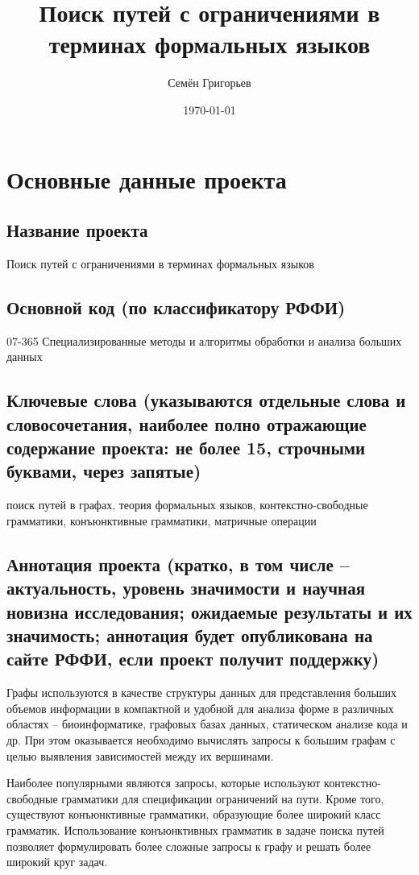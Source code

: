 \documentclass[12pt]{article}  %
\title{Поиск путей с ограничениями в терминах формальных языков}
\author{Семён Григорьев}
\date{\today}
\theoremstyle{remark}
\begin{document}

\maketitle

\section{Основные данные проекта}

\subsection{Название проекта}
Поиск путей с ограничениями в терминах формальных языков

\subsection{Основной код (по классификатору РФФИ)}
07-365 Специализированные методы и алгоритмы обработки и анализа больших данных

\subsection{Ключевые слова (указываются отдельные слова и словосочетания, наиболее полно отражающие содержание проекта: не более 15, строчными буквами, через запятые)}
поиск путей в графах, теория формальных языков, контекстно-свободные грамматики, конъюнктивные грамматики, матричные операции

\subsection{Аннотация проекта (кратко, в том числе – актуальность, уровень значимости и научная новизна исследования; ожидаемые результаты и их значимость; аннотация будет опубликована на сайте РФФИ, если проект получит поддержку)}

Графы используются в качестве структуры данных для представления больших объемов информации в компактной и удобной для анализа форме в различных областях – биоинформатике, графовых базах данных, статическом анализе кода и др. При этом оказывается необходимо вычислять запросы к большим графам с целью выявления зависимостей между их вершинами.

Наиболее популярными являются запросы, которые используют контекстно-свободные грамматики для спецификации ограничений на пути. Кроме того, существуют конъюнктивные грамматики, образующие более широкий класс грамматик. Использование конъюнктивных грамматик в задаче поиска путей позволяет формулировать более сложные запросы к графу и решать более широкий круг задач.
\end{document}
